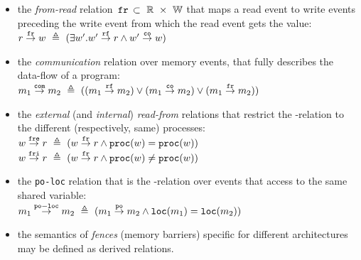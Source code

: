 \begin{itemize}

    \item the \textit{from-read} relation $\,\mathtt{fr}\, \subset~\mathbb{R}~\times~\mathbb{W}$ that maps a read event to write events preceding the write event from which the read event gets the value: \\
    $r \overset{\mathtt{fr}}{\rightarrow} w ~\triangleq~ (\exists w' . w' \overset{\mathtt{rf}}{\rightarrow} r \land w' \overset{\mathtt{co}}{\rightarrow} w)$


    \item the \textit{communication} relation \com over memory events, that fully describes the data-flow of a program: \\
    $m_1 \overset{\mathtt{com}}{\rightarrow} m_2~\triangleq~((m_1\overset{\mathtt{rf}}{\rightarrow}m_2) \lor (m_1\overset{\mathtt{co}}{\rightarrow}m_2) \lor (m_1\overset{\mathtt{fr}}{\rightarrow}m_2))$

    \item the \textit{external} (and \textit{internal}) \textit{read-from} relations that restrict the \rf-relation to the different (respectively, same) processes: \\
    $w \overset{\mathtt{fre}}{\rightarrow} r ~\triangleq~ (w \overset{\mathtt{fr}}{\rightarrow} r \land \mathtt{proc}(w) = \mathtt{proc}(w))$ \\
    $w \overset{\mathtt{fri}}{\rightarrow} r ~\triangleq~ (w \overset{\mathtt{fr}}{\rightarrow} r \land \mathtt{proc}(w) \neq \mathtt{proc}(w))$
    
    \item the \texttt{po-loc} relation that is the \po-relation over events that access to the same shared variable: \\
    $m_1 \overset{\mathtt{po-loc}}{\rightarrow} m_2 ~\triangleq~ (m_1 \overset{\mathtt{po}}{\rightarrow} m_2 \land \mathtt{loc}(m_1) = \mathtt{loc}(m_2))$

    \item the semantics of \textit{fences} (memory barriers) specific for different architectures may be defined as derived relations.


\end{itemize}


